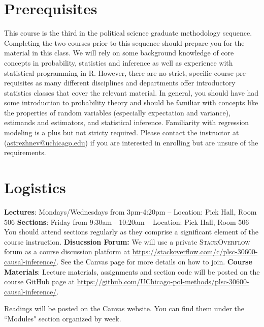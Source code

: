 \documentclass[11pt, article, oneside]{memoir}
\theoremstyle{Assumption}
\begin{document}
\section*{Prerequisites}

This course is the third in the political science graduate methodology sequence. Completing the two courses prior to this sequence should prepare you for the material in this class. We will rely on some background knowledge of core concepts in probability, statistics and inference as well as experience with statistical programming in R. However, there are no strict, specific course pre-requisites as many different disciplines and departments offer introductory statistics classes that cover the relevant material. In general, you should have had some introduction to probability theory and should be familiar with concepts like the properties of random variables (especially expectation and variance), estimands and estimators, and statistical inference. Familiarity with regression modeling is a plus but not stricty required. Please contact the instructor at (\href{mailto:astrezhnev@uchicago.edu}{astrezhnev@uchicago.edu}) if you are interested in enrolling but are unsure of the requirements. 

\section*{Logistics}

\textbf{Lectures}: Mondays/Wednesdays from 3pm-4:20pm -- Location: Pick Hall, Room 506
\newline\textbf{Sections}: Friday from 9:30am - 10:20am -- Location: Pick Hall, Room 506
\newline\newline
You should attend sections regularly as they comprise a significant element of the course instruction.
\newline\newline \textbf{Disucssion Forum:} We will use a private \textsc{StackOverflow} forum as a course discussion platform at \url{https://stackoverflow.com/c/plsc-30600-causal-inference/}. See the  Canvas page for more details on how to join.
\newline\newline\textbf{Course Materials}: Lecture materials, assignments and section code will be posted on the course GitHub page at \url{https://github.com/UChicago-pol-methods/plsc-30600-causal-inference/}.

Readings will be posted on the Canvas website. You can find them under the ``Modules" section organized by week.
\end{document}
